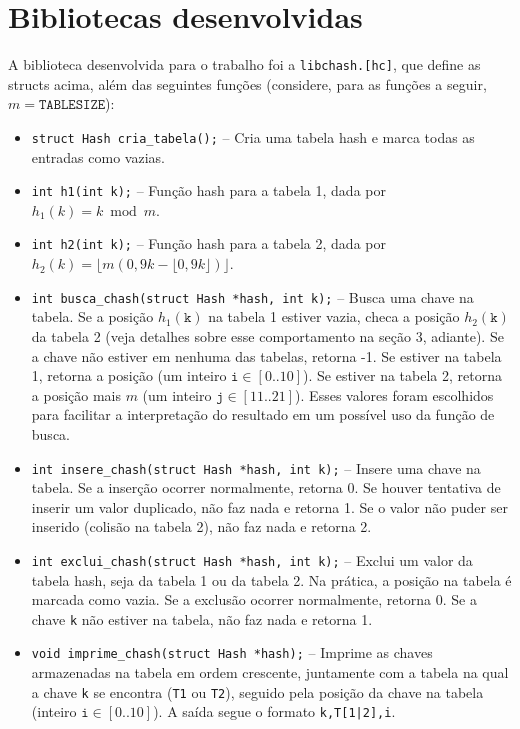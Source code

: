 \documentclass[a4paper, 11pt]{article}
\begin{document}
\section{Bibliotecas desenvolvidas}
A biblioteca desenvolvida para o trabalho foi a \texttt{libchash.[hc]}, que define as
structs acima, além das seguintes funções (considere, para as funções a seguir,
$m = \texttt{TABLESIZE}$):
\begin{itemize}
    \item \texttt{struct Hash cria\_tabela();} -- Cria uma tabela hash e marca todas as
        entradas como vazias.
    \item \texttt{int h1(int k);} -- Função hash para a tabela 1, dada por
        $h_1(k) = k \bmod m$.
    \item \texttt{int h2(int k);} -- Função hash para a tabela 2, dada por 
        $h_2(k) = \lfloor m(0,9k - \lfloor 0,9k \rfloor) \rfloor$.
    \item \texttt{int busca\_chash(struct Hash *hash, int k);} -- Busca uma chave na
        tabela. Se a posição $h_1(\texttt{k})$ na tabela 1 estiver vazia, checa a
        posição $h_2(\texttt{k})$ da tabela 2 (veja detalhes sobre esse comportamento
        na seção 3, adiante). Se a chave não estiver em nenhuma das tabelas, retorna
        -1. Se estiver na tabela 1, retorna a posição (um inteiro $\texttt{i} \in
        [0..10]$). Se estiver na tabela 2, retorna a posição mais $m$ (um inteiro
        $\texttt{j} \in [11..21]$). Esses valores foram escolhidos para facilitar a
        interpretação do resultado em um possível uso da função de busca.
    \item \texttt{int insere\_chash(struct Hash *hash, int k);} -- Insere uma chave na
        tabela. Se a inserção ocorrer normalmente, retorna 0. Se houver tentativa de
        inserir um valor duplicado, não faz nada e retorna 1. Se o valor não puder ser
        inserido (colisão na tabela 2), não faz nada e retorna 2.
    \item \texttt{int exclui\_chash(struct Hash *hash, int k);} -- Exclui um valor da
        tabela hash, seja da tabela 1 ou da tabela 2. Na prática, a posição na tabela é
        marcada como vazia. Se a exclusão ocorrer normalmente, retorna 0. Se a chave
        \texttt{k} não estiver na tabela, não faz nada e retorna 1.
    \item \texttt{void imprime\_chash(struct Hash *hash);} -- Imprime as chaves
        armazenadas na tabela em ordem crescente, juntamente com a tabela na qual a
        chave \texttt{k} se encontra (\texttt{T1} ou \texttt{T2}), seguido pela posição
        da chave na tabela (inteiro $\texttt{i} \in [0..10]$). A saída segue o formato
        \texttt{k,T[1|2],i}.


\end{itemize}
\end{document}
